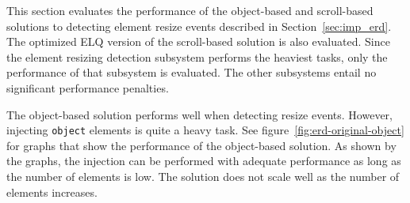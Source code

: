 \documentclass{acm_proc_article-sp}
\newcommand{\code}[1]{\texttt{#1}}
\newcommand{\gls}[1]{#1}
\begin{document}
    
      This section evaluates the performance of the object-based and scroll-based solutions to detecting \gls{element} resize events described in Section~\ref{sec:imp_erd}.
      The optimized \gls{ELQ} version of the scroll-based solution is also evaluated.
      Since the element resizing detection subsystem performs the heaviest tasks, only the performance of that subsystem is evaluated.
      The other subsystems entail no significant performance penalties.

      The object-based solution performs well when detecting resize events.
      However, injecting \code{object} elements is quite a heavy task.
      See figure~\ref{fig:erd-original-object} for graphs that show the performance of the object-based solution.
      As shown by the graphs, the injection can be performed with adequate performance as long as the number of elements is low.
      The solution does not scale well as the number of elements increases.
\end{document}
